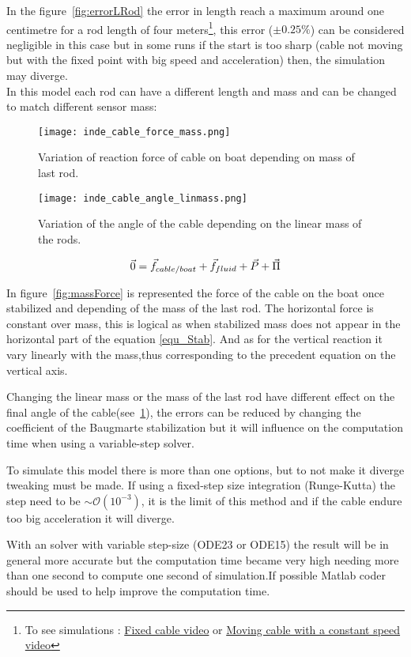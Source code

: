 In the figure~\ref{fig:errorLRod} the error in length reach a maximum around one centimetre for a rod length of four meters\footnote{To see simulations : \href{https://www.youtube.com/watch?v=T7DRGq3E5x8}{Fixed cable video} or \href{https://www.youtube.com/watch?v=V4X0PsgsXZY to see simulations}{Moving cable with a constant speed video}}, this error ($\pm 0.25 \% $) can be considered negligible in this case but in some runs if the start is too sharp (cable not moving but with the fixed point with big speed and acceleration) then, the simulation may diverge.\\

In this model each rod can have a different length and mass and can be changed to match different sensor mass:

\begin{figure}[H]
\centering
    \begin{minipage}[b]{0.4\textwidth}
    \centering
    \texttt{[image: inde\_cable\_force\_mass.png]}
    \caption{Variation of reaction force of cable on boat depending on mass of last rod.}
    \label{fig:massForce}
    \end{minipage}
    \hfill
    \begin{minipage}[b]{0.45\textwidth}
    \centering
    \texttt{[image: inde\_cable\_angle\_linmass.png]}
    \caption{Variation of the angle of the cable depending on the linear mass of the rods.}
    \label{fig:linmassAngle}
    \end{minipage}
\end{figure}

\begin{equation}
 \vec{0} = \vec{f}_{cable/boat}+\vec{f}_{fluid}+\vec{P}+\vec{\Pi}\\
 \label{equ_Stab}
\end{equation}


In figure~\ref{fig:massForce} is represented the force of the cable on the boat once stabilized and depending of the mass of the last rod. The horizontal force is constant over mass, this is logical as when stabilized mass does not appear in the horizontal part of the equation \eqref{equ_Stab}. And as for the vertical reaction it vary linearly with the mass,thus corresponding to the precedent equation on the vertical axis.

Changing the linear mass or the mass of the last rod have different effect on the final angle of the cable(see~\ref{fig:linmassAngle}), the errors can be reduced by changing the coefficient of the Baugmarte stabilization but it will influence on the computation time when using a variable-step solver.


To simulate this model there is more than one options, but to not make it diverge tweaking must be made.
If using a fixed-step size integration (Runge-Kutta) the step need to be $\sim\mathcal{O}(10^{-3})$, it is the limit of this method and if the cable endure too big acceleration it will diverge.

With an solver with variable step-size (ODE23 or ODE15) the result will be in general more accurate but the computation time became very high needing more than one second to compute one second of simulation.If possible Matlab coder should be used to help improve the computation time.
